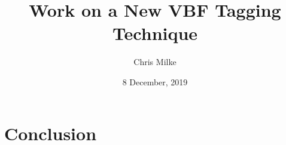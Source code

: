 \documentclass{beamer}
\begin{document}
\title{Work on a New VBF Tagging Technique}
\author{Chris Milke}
\date{8 December, 2019}

\frame{\titlepage}






\section{Conclusion} %

\end{document}
